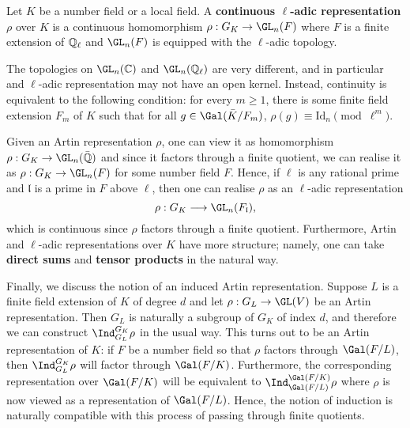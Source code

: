 \begin{defn}
    Let $K$ be a number field or a local field. A \textbf{continuous $\ell$-adic representation} $\rho$ over $K$ is a continuous homomorphism $\rho:G_K\to\GL_n(F)$ where $F$ is a finite extension of $\mathbb{Q}_\ell$ and $\GL_n(F)$ is equipped with the $\ell$-adic topology.
\end{defn}

\begin{rem} \label{rem_cont_ladic}
    The topologies on $\GL_n(\CC)$ and $\GL_n(\QQ_\ell)$ are very different, and in particular and $\ell$-adic representation may not have an open kernel. Instead, continuity is equivalent to the following condition: for every $m\geq1$, there is some finite field extension $F_m$ of $K$ such that for all $g\in\Gal(\bar{K}/F_m)$, $\rho(g)\equiv \mathrm{Id}_n\pmod{\ell^m}$.
\end{rem}

Given an Artin representation $\rho$, one can view it as homomorphism $\rho:G_K\to\GL_n(\bar{\QQ})$ and since it factors through a finite quotient, we can realise it as $\rho:G_K\to\GL_n(F)$ for some number field $F$. Hence, if $\ell$ is any rational prime and $\mathfrak{l}$ is a prime in $F$ above $\ell$, then one can realise $\rho$ as an $\ell$-adic representation $$\rho:G_K\longrightarrow\GL_n(F_\mathfrak{l}),$$
which is continuous since $\rho$ factors through a finite quotient. Furthermore, Artin and $\ell$-adic representations over $K$ have more structure; namely, one can take \textbf{direct sums} and \textbf{tensor products} in the natural way.


Finally, we discuss the notion of an induced Artin representation. Suppose $L$ is a finite field extension of $K$ of degree $d$ and let $\rho:G_L\to\GL(V)$ be an Artin representation. Then $G_L$ is naturally a subgroup of $G_K$ of index $d$, and therefore we can construct $\Ind_{G_L}^{G_K}\rho$ in the usual way. This turns out to be an Artin representation of $K$: if $F$ be a number field so that $\rho$ factors through $\Gal(F/L)$, then $\Ind_{G_L}^{G_K}\rho$ will factor through $\Gal(F/K)$. Furthermore, the corresponding representation over $\Gal(F/K)$ will be equivalent to $\Ind_{\Gal(F/L)}^{\Gal(F/K)}\rho$ where $\rho$ is now viewed as a representation of $\Gal(F/L)$. Hence, the notion of induction is naturally compatible with this process of passing through finite quotients. 


